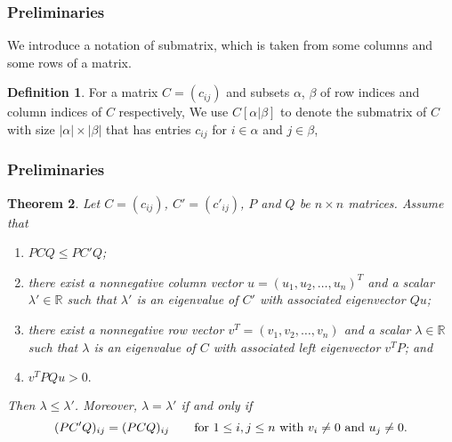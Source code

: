 \documentclass[]{beamer}
\theoremstyle{plain}
\newtheorem{thm}{Theorem}[section]
\theoremstyle{definition}
\newtheorem{defn}[thm]{Definition}
\begin{document}
\begin{frame}
    \frametitle{Preliminaries}
    We introduce a notation of submatrix, which is taken from some columns and some rows of a matrix.
    \begin{defn}
        For a matrix $C=(c_{ij})$ and subsets $\alpha$, $\beta$ of row indices and column indices of 
        $C$ respectively,  We use $C[\alpha|\beta]$ to denote the submatrix of $C$ with size
         $ |\alpha| \times |\beta| $ that has entries $c_{ij}$ for $i\in \alpha$ and $j\in\beta$,
    \end{defn}

\end{frame}

\begin{frame}
    \frametitle{ Preliminaries}


    \begin{thm}
        Let $C=(c_{ij})$, $C'=(c'_{ij})$, $P$ and $Q$ be  $n\times n$ matrices.
        Assume that
        \begin{enumerate}
            \item[(i)]    $PCQ\leq PC'Q$;
            \item[(ii)]  there exist a nonnegative column vector $u=(u_1, u_2, \ldots, u_n)^T$  and a scalar $\lambda'\in \mathbb{R}$ such that $\lambda'$ is an eigenvalue of $C'$ with associated eigenvector $Qu$;
            \item[(iii)] there exist a nonnegative row vector $v^T=(v_1, v_2, \ldots, v_n)$  and a scalar $\lambda\in \mathbb{R}$
            such that $\lambda$ is an eigenvalue of $C$ with associated  left eigenvector $v^TP$; and
            \item[(iv)] $v^TPQu>0.$
            \end{enumerate}
            Then $\lambda\leq \lambda'$.
                Moreover, $\lambda=\lambda'$ 
            if and only if
                \begin{equation*}
                    \label{e3}
            (PC'Q)_{ij}=(PCQ)_{ij}\qquad \hbox{for~}1\leq i, j\leq n \hbox{~with~} v_i\ne 0 \hbox{~and~} u_j\ne 0.
        \end{equation*}
    \end{thm}
\end{frame}
\end{document}
